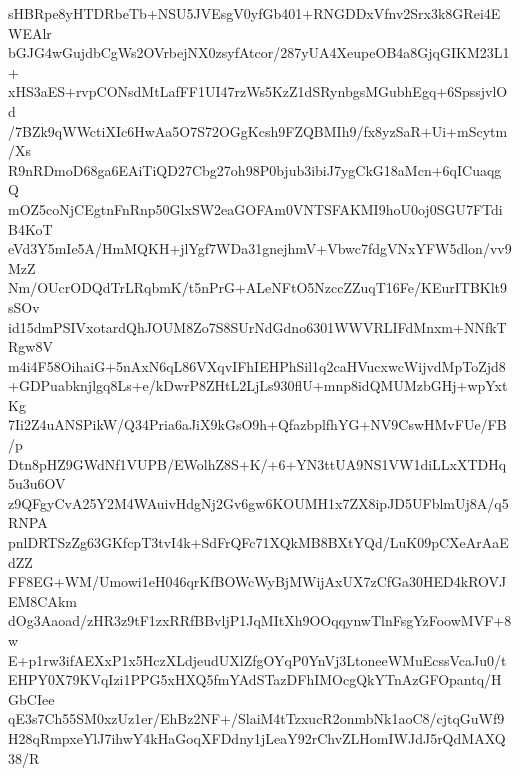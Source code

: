 sHBRpe8yHTDRbeTb+NSU5JVEsgV0yfGb401+RNGDDxVfnv2Srx3k8GRei4EWEAlr
bGJG4wGujdbCgWs2OVrbejNX0zsyfAtcor/287yUA4XeupeOB4a8GjqGIKM23L1+
xHS3aES+rvpCONsdMtLafFF1UI47rzWs5KzZ1dSRynbgsMGubhEgq+6SpssjvlOd
/7BZk9qWWctiXIc6HwAa5O7S72OGgKcsh9FZQBMIh9/fx8yzSaR+Ui+mScytm/Xs
R9nRDmoD68ga6EAiTiQD27Cbg27oh98P0bjub3ibiJ7ygCkG18aMcn+6qICuaqgQ
mOZ5coNjCEgtnFnRnp50GlxSW2eaGOFAm0VNTSFAKMI9hoU0oj0SGU7FTdiB4KoT
eVd3Y5mIe5A/HmMQKH+jlYgf7WDa31gnejhmV+Vbwc7fdgVNxYFW5dlon/vv9MzZ
Nm/OUcrODQdTrLRqbmK/t5nPrG+ALeNFtO5NzccZZuqT16Fe/KEurITBKlt9sSOv
id15dmPSIVxotardQhJOUM8Zo7S8SUrNdGdno6301WWVRLIFdMnxm+NNfkTRgw8V
m4i4F58OihaiG+5nAxN6qL86VXqvIFhIEHPhSil1q2caHVucxwcWijvdMpToZjd8
+GDPuabknjlgq8Ls+e/kDwrP8ZHtL2LjLs930flU+mnp8idQMUMzbGHj+wpYxtKg
7Ii2Z4uANSPikW/Q34Pria6aJiX9kGsO9h+QfazbplfhYG+NV9CswHMvFUe/FB/p
Dtn8pHZ9GWdNf1VUPB/EWolhZ8S+K/+6+YN3ttUA9NS1VW1diLLxXTDHq5u3u6OV
z9QFgyCvA25Y2M4WAuivHdgNj2Gv6gw6KOUMH1x7ZX8ipJD5UFblmUj8A/q5RNPA
pnlDRTSzZg63GKfcpT3tvI4k+SdFrQFc71XQkMB8BXtYQd/LuK09pCXeArAaEdZZ
FF8EG+WM/Umowi1eH046qrKfBOWcWyBjMWijAxUX7zCfGa30HED4kROVJEM8CAkm
dOg3Aaoad/zHR3z9tF1zxRRfBBvljP1JqMItXh9OOqqynwTlnFsgYzFoowMVF+8w
E+p1rw3ifAEXxP1x5HczXLdjeudUXlZfgOYqP0YnVj3LtoneeWMuEcssVcaJu0/t
EHPY0X79KVqIzi1PPG5xHXQ5fmYAdSTazDFhIMOcgQkYTnAzGFOpantq/HGbCIee
qE3s7Ch55SM0xzUz1er/EhBz2NF+/SlaiM4tTzxucR2onmbNk1aoC8/cjtqGuWf9
H28qRmpxeYlJ7ihwY4kHaGoqXFDdny1jLeaY92rChvZLHomIWJdJ5rQdMAXQ38/R
